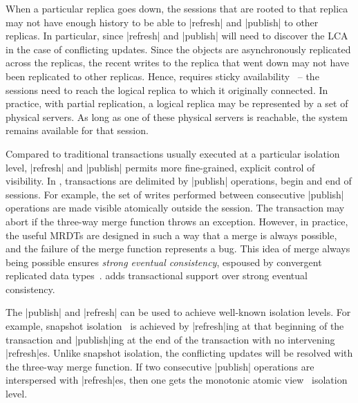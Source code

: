 When a particular replica goes down, the sessions that are rooted to that
replica may not have enough history to be able to |refresh| and |publish| to
other replicas. In particular, since |refresh| and |publish| will need to
discover the LCA in the case of conflicting updates. Since the objects are
asynchronously replicated across the replicas, the recent writes to the replica
that went down may not have been replicated to other replicas. Hence, \name
requires sticky availability~\cite{Bailis13} -- the sessions need to reach the
logical replica to which it originally connected. In practice, with partial
replication, a logical replica may be represented by a set of physical servers.
As long as one of these physical servers is reachable, the system remains
available for that session.

Compared to traditional transactions usually executed at a particular isolation
level, |refresh| and |publish| permits more fine-grained, explicit control of
visibility. In \name, transactions are delimited by |publish| operations, begin
and end of sessions. For example, the set of writes performed between
consecutive |publish| operations are made visible atomically outside the
session. The transaction may abort if the three-way merge function throws an
exception. However, in practice, the useful MRDTs are designed in such a way
that a merge is always possible, and the failure of the merge function
represents a bug. This idea of merge always being possible ensures \emph{strong
eventual consistency}, espoused by convergent replicated data
types~\cite{Shapiro11}. \name adds transactional support over strong eventual
consistency.

The |publish| and |refresh| can be used to achieve well-known isolation levels.
For example, snapshot isolation~\cite{Berenson95} is achieved by |refresh|ing
at that beginning of the transaction and |publish|ing at the end of the
transaction with no intervening |refresh|es. Unlike snapshot isolation, the
conflicting updates will be resolved with the three-way merge function. If two
consecutive |publish| operations are interspersed with |refresh|es, then one
gets the monotonic atomic view~\cite{Bailis13} isolation level.

